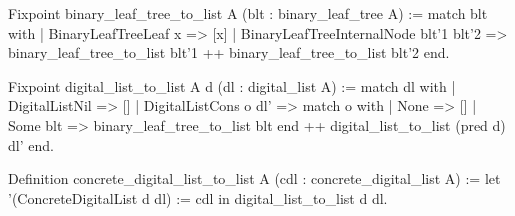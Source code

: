 \documentclass{article}
\begin{document}
\begin{coq}
Fixpoint binary_leaf_tree_to_list {A} (blt : binary_leaf_tree A) :=
  match blt with
  | BinaryLeafTreeLeaf x => [x]
  | BinaryLeafTreeInternalNode blt'1 blt'2 =>
    binary_leaf_tree_to_list blt'1 ++ binary_leaf_tree_to_list blt'2
  end.
\end{coq}

\begin{coq}
Fixpoint digital_list_to_list {A} d (dl : digital_list A) :=
  match dl with
  | DigitalListNil => []
  | DigitalListCons o dl' =>
    match o with
    | None => []
    | Some blt => binary_leaf_tree_to_list blt
    end ++ digital_list_to_list (pred d) dl'
  end.

Definition concrete_digital_list_to_list {A} (cdl : concrete_digital_list A) :=
  let '(ConcreteDigitalList d dl) := cdl in digital_list_to_list d dl.
\end{coq}

\printbibliography
\end{document}
